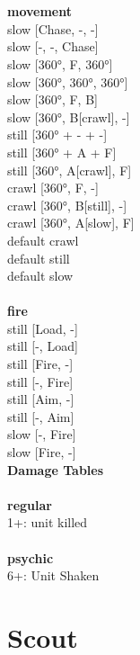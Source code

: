  
\ \\




\ \\ {\bf movement } \\
slow [Chase, -, -] \\
slow [-, -, Chase] \\
slow [360°, F, 360°] \\
slow [360°, 360°, 360°] \\
slow [360°, F, B] \\
slow [360°, B[crawl], -] \\
still [360° + - + -] \\
still [360° + A + F] \\
still [360°, A[crawl], F] \\
crawl [360°, F, -] \\
crawl [360°, B[still], -] \\
crawl [360°, A[slow], F] \\
default crawl \\
default still \\
default slow \\
\ \\ {\bf fire } \\
still [Load, -] \\
still [-, Load] \\
still [Fire, -] \\
still [-, Fire] \\
still [Aim, -] \\
still [-, Aim] \\
slow [-, Fire] \\
slow [Fire, -] \\


{\bf Damage Tables} \\
\ \\ {\bf regular } \\
1+: unit killed \\
\ \\ {\bf psychic } \\
6+: Unit Shaken \\










\pagebreak\pagebreak

\section{ Scout }

